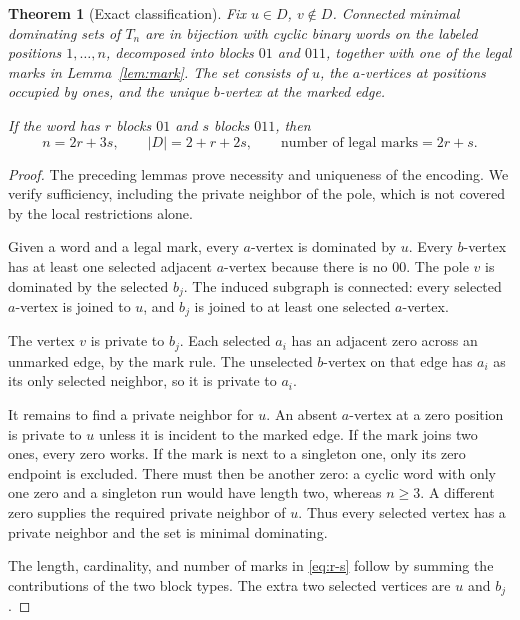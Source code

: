 \documentclass[11pt,letterpaper]{article}
\numberwithin{equation}{section}
\newtheorem{theorem}{Theorem}[section]
\theoremstyle{definition}
\theoremstyle{remark}
\begin{document}
\begin{theorem}[Exact classification]\label{thm:classification}
Fix $u\in D$, $v\notin D$. Connected minimal dominating sets of $T_n$
are in bijection with cyclic binary words on the labeled positions
$1,\ldots,n$, decomposed into blocks $01$ and $011$, together with
one of the legal marks in Lemma~\ref{lem:mark}. The set consists of $u$,
the $a$-vertices at positions occupied by ones, and the unique
$b$-vertex at the marked edge.

If the word has $r$ blocks $01$ and $s$ blocks $011$, then
\begin{equation}\label{eq:r-s}
 n=2r+3s,\qquad |D|=2+r+2s,
 \qquad\text{number of legal marks}=2r+s.
\end{equation}
\end{theorem}
\begin{proof}
The preceding lemmas prove necessity and uniqueness of the encoding.
We verify sufficiency, including the private neighbor of the pole,
which is not covered by the local restrictions alone.

Given a word and a legal mark, every $a$-vertex is dominated by $u$.
Every $b$-vertex has at least one selected adjacent $a$-vertex because
there is no $00$. The pole $v$ is dominated by the selected $b_j$.
The induced subgraph is connected: every selected $a$-vertex is joined
to $u$, and $b_j$ is joined to at least one selected $a$-vertex.

The vertex $v$ is private to $b_j$. Each selected $a_i$ has an
adjacent zero across an unmarked edge, by the mark rule. The
unselected $b$-vertex on that edge has $a_i$ as its only selected
neighbor, so it is private to $a_i$.

It remains to find a private neighbor for $u$. An absent $a$-vertex
at a zero position is private to $u$ unless it is incident to the
marked edge. If the mark joins two ones, every zero works. If the
mark is next to a singleton one, only its zero endpoint is excluded.
There must then be another zero: a cyclic word with only one zero
and a singleton run would have length two, whereas $n\ge3$.
A different zero supplies the required private neighbor of $u$.
Thus every selected vertex has a private neighbor and the set is
minimal dominating.

The length, cardinality, and number of marks in \eqref{eq:r-s} follow
by summing the contributions of the two block types. The extra two
selected vertices are $u$ and $b_j$.
\end{proof}
\end{document}

